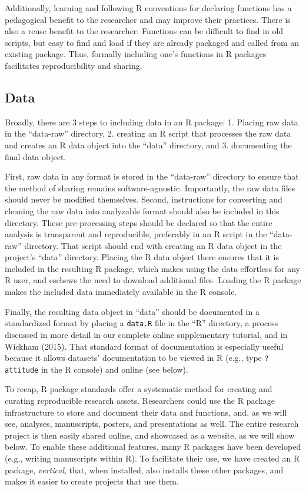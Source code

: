 \documentclass[
  english,
  jou,floatsintext]{apa6}
\begin{document}
Additionally, learning and following R conventions for declaring functions has a pedagogical benefit to the researcher and may improve their practices. There is also a reuse benefit to the researcher: Functions can be difficult to find in old scripts, but easy to find and load if they are already packaged and called from an existing package. Thus, formally including one's functions in R packages facilitates reproducibility and sharing.

\hypertarget{data}{%
\subsection{Data}\label{data}}

Broadly, there are 3 steps to including data in an R package: 1. Placing raw data in the ``data-raw'' directory, 2. creating an R script that processes the raw data and creates an R data object into the ``data'' directory, and 3. documenting the final data object.

First, raw data in any format is stored in the ``data-raw'' directory to ensure that the method of sharing remains software-agnostic. Importantly, the raw data files should never be modified themselves. Second, instructions for converting and cleaning the raw data into analyzable format should also be included in this directory. These pre-processing steps should be declared so that the entire analysis is transparent and reproducible, preferably in an R script in the ``data-raw'' directory. That script should end with creating an R data object in the project's ``data'' directory. Placing the R data object there ensures that it is included in the resulting R package, which makes using the data effortless for any R user, and eschews the need to download additional files. Loading the R package makes the included data immediately available in the R console.

Finally, the resulting data object in ``data'' should be documented in a standardized format by placing a \texttt{data.R} file in the ``R'' directory, a process discussed in more detail in our complete online supplementary tutorial, and in Wickham (2015). That standard format of documentation is especially useful because it allows datasets' documentation to be viewed in R (e.g., type \texttt{?attitude} in the R console) and online (see below).

To recap, R package standards offer a systematic method for creating and curating reproducible research assets. Researchers could use the R package infrastructure to store and document their data and functions, and, as we will see, analyses, manuscripts, posters, and presentations as well. The entire research project is then easily shared online, and showcased as a website, as we will show below. To enable these additional features, many R packages have been developed (e.g., writing manuscripts within R). To facilitate their use, we have created an R package, \emph{vertical}, that, when installed, also installs these other packages, and makes it easier to create projects that use them.
\end{document}
